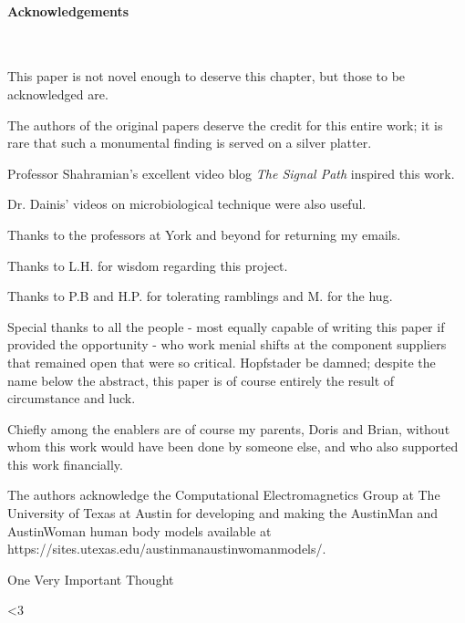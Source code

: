 
\clearpage
\paragraph{Acknowledgements}\

This paper is not novel enough to deserve this chapter, but those to be acknowledged are.

The authors of the original papers deserve the credit for this entire work;  it is rare that such a monumental finding is served on a silver platter.

Professor Shahramian's excellent video blog {\it The Signal Path} inspired this work. 

Dr. Dainis' videos on microbiological technique were also useful.

Thanks to the professors at York and beyond for returning my emails. 

Thanks to L.H. for wisdom regarding this project.

Thanks to P.B and H.P. for tolerating ramblings and M. for the hug.

Special thanks to all the people - most equally capable of writing this paper if provided the opportunity - who work menial shifts at the component suppliers that remained open that were so critical. Hopfstader be damned; despite the name below the abstract, this paper is of course entirely the result of circumstance and luck. 

Chiefly among the enablers are of course my parents, Doris and Brian, without whom this work would have been done by someone else, and who also supported this work financially. 


The authors acknowledge the Computational Electromagnetics Group at The University of Texas at Austin for developing and making the AustinMan and AustinWoman human body models available at https://sites.utexas.edu/austinmanaustinwomanmodels/.

One Very Important Thought



{\Large <3}

